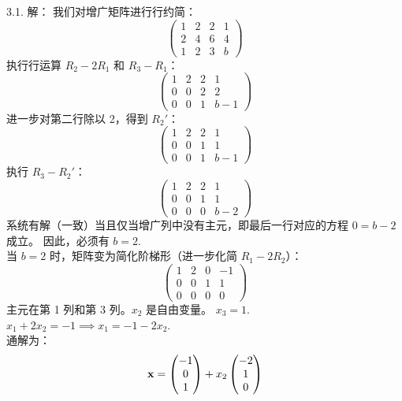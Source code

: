 \begin{exer}
\vspace{5ex}


3.1. 解：
我们对增广矩阵进行行约简：
$$
\left(\begin{array}{ccc|c} 1 & 2 & 2 & 1 \\ 2 & 4 & 6 & 4 \\ 1 & 2 & 3 & b \end{array}\right)
$$
执行行运算 $R_2 - 2R_1$ 和 $R_3 - R_1$：
$$
\left(\begin{array}{ccc|c} 1 & 2 & 2 & 1 \\ 0 & 0 & 2 & 2 \\ 0 & 0 & 1 & b-1 \end{array}\right)
$$
进一步对第二行除以 2，得到 $R_2'$：
$$
\left(\begin{array}{ccc|c} 1 & 2 & 2 & 1 \\ 0 & 0 & 1 & 1 \\ 0 & 0 & 1 & b-1 \end{array}\right)
$$
执行 $R_3 - R_2'$：
$$
\left(\begin{array}{ccc|c} 1 & 2 & 2 & 1 \\ 0 & 0 & 1 & 1 \\ 0 & 0 & 0 & b-2 \end{array}\right)
$$
系统有解（一致）当且仅当增广列中没有主元，即最后一行对应的方程 $0 = b-2$ 成立。
因此，必须有 $b = 2$.~
\\
当 $b=2$ 时，矩阵变为简化阶梯形（进一步化简 $R_1 - 2R_2$）：
$$
\left(\begin{array}{ccc|c} 1 & 2 & 0 & -1 \\ 0 & 0 & 1 & 1 \\ 0 & 0 & 0 & 0 \end{array}\right)
$$
主元在第 1 列和第 3 列。$x_2$ 是自由变量。
$x_3 = 1$.~
$x_1 + 2x_2 = -1 \implies x_1 = -1 - 2x_2$.~
\\
通解为：
$$ \mathbf{x} = \begin{pmatrix} -1 \\ 0 \\ 1 \end{pmatrix} + x_2 \begin{pmatrix} -2 \\ 1 \\ 0 \end{pmatrix} $$


\end{exer}
